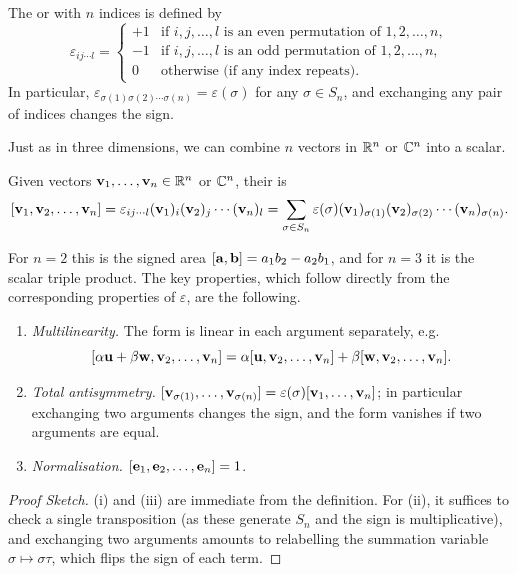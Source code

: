 \documentclass[a4paper]{scrartcl}
\begin{document}
\begin{definition}
	The  or  with $n$ indices is defined by
	$$
	\varepsilon_{ij \cdots l} = \begin{cases}
		+1 & \mbox{if } i, j, \dots, l \text{ is an even permutation of } 1, 2, \dots, n, \\
		-1 & \mbox{if } i, j, \dots, l \text{ is an odd permutation of } 1, 2, \dots, n, \\
		0 & \mbox{otherwise (if any index repeats)}.
	\end{cases}
	$$
	In particular, $\varepsilon_{\sigma(1)\sigma(2)\cdots\sigma(n)} = \varepsilon(\sigma)$ for any $\sigma \in S_n$, and exchanging any pair of indices changes the sign.
\end{definition}

Just as in three dimensions, we can combine $n$ vectors in $\mathbb{R}^n$ or $\mathbb{C}^n$ into a scalar.

\begin{definition}
	Given vectors $\mathbf{v}_1, \dots, \mathbf{v}_n \in \mathbb{R}^n$ or $\mathbb{C}^n$, their  is
	$$
	[\mathbf{v}_1, \mathbf{v}_2, \dots, \mathbf{v}_n] = \varepsilon_{ij\cdots l}(\mathbf{v}_1)_i (\mathbf{v}_2)_j \cdots (\mathbf{v}_n)_l = \sum_{\sigma \in S_n} \varepsilon(\sigma)(\mathbf{v}_1)_{\sigma(1)}(\mathbf{v}_2)_{\sigma(2)} \cdots (\mathbf{v}_n)_{\sigma(n)}.
	$$
\end{definition}

For $n = 2$ this is the signed area $[\mathbf{a}, \mathbf{b}] = a_1 b_2 - a_2 b_1$, and for $n = 3$ it is the scalar triple product. The key properties, which follow directly from the corresponding properties of $\varepsilon$, are the following.

\begin{proposition}
	\begin{enumerate}[label=(\roman*)]
		\item \emph{Multilinearity.} The form is linear in each argument separately, e.g.
		$$[\alpha \mathbf{u} + \beta \mathbf{w}, \mathbf{v}_2, \dots, \mathbf{v}_n] = \alpha[\mathbf{u}, \mathbf{v}_2, \dots, \mathbf{v}_n] + \beta [\mathbf{w}, \mathbf{v}_2, \dots, \mathbf{v}_n].$$
		\item \emph{Total antisymmetry.} $[\mathbf{v}_{\sigma(1)}, \dots, \mathbf{v}_{\sigma(n)}] = \varepsilon(\sigma)[\mathbf{v}_1, \dots, \mathbf{v}_n]$; in particular exchanging two arguments changes the sign, and the form vanishes if two arguments are equal.
		\item \emph{Normalisation.} $[\mathbf{e}_1, \mathbf{e}_2, \dots, \mathbf{e}_n] = 1$.
	\end{enumerate}
\end{proposition}
\begin{proof}[Proof Sketch]
	(i) and (iii) are immediate from the definition. For (ii), it suffices to check a single transposition (as these generate $S_n$ and the sign is multiplicative), and exchanging two arguments amounts to relabelling the summation variable $\sigma \mapsto \sigma \tau$, which flips the sign of each term.
\end{proof}
\end{document}
